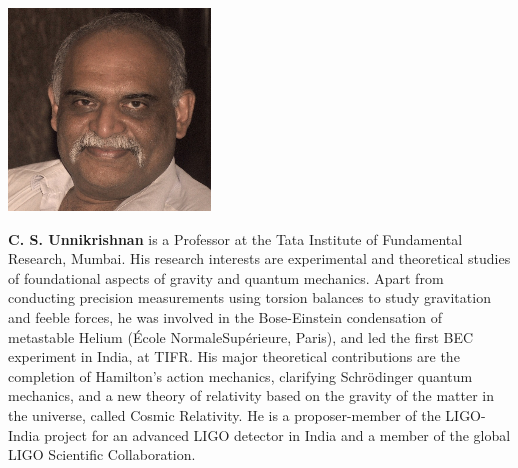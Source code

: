 \centerline{\includegraphics[scale=.7]{authorsphotos//C_S_Unnikrishnan.png}} 
\bigskip

\noindent
\textbf{C. S. Unnikrishnan} is a Professor at the Tata Institute of Fundamental Research, Mumbai. His research interests are experimental and theoretical studies of foundational aspects of gravity and quantum mechanics. Apart from conducting precision measurements using torsion balances to study gravitation and feeble forces, he was involved in the Bose-Einstein condensation of metastable Helium (\'Ecole Normale\break Sup\'erieure, Paris), and led the first BEC experiment in India, at TIFR. His major theoretical contributions are the completion of Hamilton's action mechanics, clarifying Schr\"{o}dinger quantum mechanics, and a new theory of relativity based on the gravity of the matter in the universe, called Cosmic Relativity. He is a proposer-member of the LIGO-India project for an advanced LIGO detector in India and a member of the global LIGO Scientific Collaboration.

